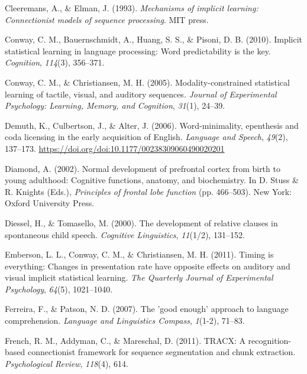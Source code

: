 \documentclass[
  english,
  man,floatsintext]{apa6}
\begin{document}
\leavevmode\hypertarget{ref-cleeremans1993mechanisms}{}%
Cleeremans, A., \& Elman, J. (1993). \emph{Mechanisms of implicit learning: Connectionist models of sequence processing}. MIT press.

\leavevmode\hypertarget{ref-conway2010implicit}{}%
Conway, C. M., Bauernschmidt, A., Huang, S. S., \& Pisoni, D. B. (2010). Implicit statistical learning in language processing: Word predictability is the key. \emph{Cognition}, \emph{114}(3), 356--371.

\leavevmode\hypertarget{ref-conway2005modality}{}%
Conway, C. M., \& Christiansen, M. H. (2005). Modality-constrained statistical learning of tactile, visual, and auditory sequences. \emph{Journal of Experimental Psychology: Learning, Memory, and Cognition}, \emph{31}(1), 24--39.

\leavevmode\hypertarget{ref-demuth2006word}{}%
Demuth, K., Culbertson, J., \& Alter, J. (2006). Word-minimality, epenthesis and coda licensing in the early acquisition of English. \emph{Language and Speech}, \emph{49}(2), 137--173. \url{https://doi.org/doi:10.1177/00238309060490020201}

\leavevmode\hypertarget{ref-diamond2002normal}{}%
Diamond, A. (2002). Normal development of prefrontal cortex from birth to young adulthood: Cognitive functions, anatomy, and biochemistry. In D. Stuss \& R. Knights (Eds.), \emph{Principles of frontal lobe function} (pp. 466--503). New York: Oxford University Press.

\leavevmode\hypertarget{ref-diessel2000development}{}%
Diessel, H., \& Tomasello, M. (2000). The development of relative clauses in spontaneous child speech. \emph{Cognitive Linguistics}, \emph{11}(1/2), 131--152.

\leavevmode\hypertarget{ref-emberson2011timing}{}%
Emberson, L. L., Conway, C. M., \& Christiansen, M. H. (2011). Timing is everything: Changes in presentation rate have opposite effects on auditory and visual implicit statistical learning. \emph{The Quarterly Journal of Experimental Psychology}, \emph{64}(5), 1021--1040.

\leavevmode\hypertarget{ref-ferreira2007good}{}%
Ferreira, F., \& Patson, N. D. (2007). The 'good enough' approach to language comprehension. \emph{Language and Linguistics Compass}, \emph{1}(1-2), 71--83.

\leavevmode\hypertarget{ref-french2011tracx}{}%
French, R. M., Addyman, C., \& Mareschal, D. (2011). TRACX: A recognition-based connectionist framework for sequence segmentation and chunk extraction. \emph{Psychological Review}, \emph{118}(4), 614.
\end{document}
